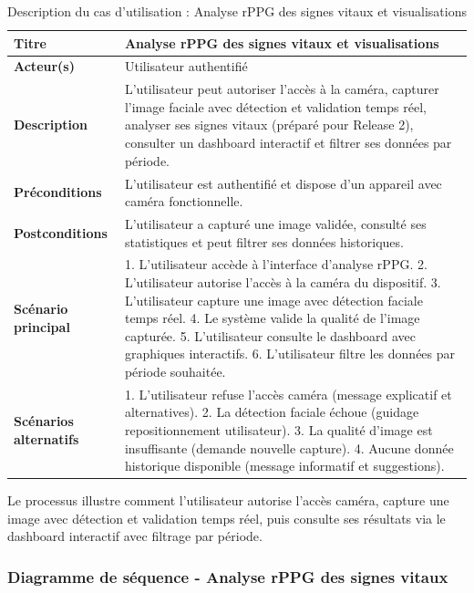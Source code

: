 \begin{table}[H]\centering
\small
\renewcommand{\arraystretch}{1.2}
\begin{tabularx}{\linewidth}{|p{3cm}|X|}
\hline
\textbf{Titre} & Analyse rPPG des signes vitaux et visualisations \\
\hline
\textbf{Acteur(s)} & Utilisateur authentifié \\
\hline
\textbf{Description} & L'utilisateur peut autoriser l'accès à la caméra, capturer l'image faciale avec détection et validation temps réel, analyser ses signes vitaux (préparé pour Release 2), consulter un dashboard interactif et filtrer ses données par période. \\
\hline
\textbf{Préconditions} & L'utilisateur est authentifié et dispose d'un appareil avec caméra fonctionnelle. \\
\hline
\textbf{Postconditions} & L'utilisateur a capturé une image validée, consulté ses statistiques et peut filtrer ses données historiques. \\
\hline
\textbf{Scénario principal} & 
1. L'utilisateur accède à l'interface d'analyse rPPG.
2. L'utilisateur autorise l'accès à la caméra du dispositif.
3. L'utilisateur capture une image avec détection faciale temps réel.
4. Le système valide la qualité de l'image capturée.
5. L'utilisateur consulte le dashboard avec graphiques interactifs.
6. L'utilisateur filtre les données par période souhaitée. \\
\hline
\textbf{Scénarios alternatifs} & 
1. L'utilisateur refuse l'accès caméra (message explicatif et alternatives).
2. La détection faciale échoue (guidage repositionnement utilisateur).
3. La qualité d'image est insuffisante (demande nouvelle capture).
4. Aucune donnée historique disponible (message informatif et suggestions). \\
\hline
\end{tabularx}
\caption{Description du cas d'utilisation : Analyse rPPG des signes vitaux et visualisations}
\end{table}

Le processus illustre comment l'utilisateur autorise l'accès caméra, capture une image avec détection et validation temps réel, puis consulte ses résultats via le dashboard interactif avec filtrage par période.

\subsubsection*{Diagramme de séquence - Analyse rPPG des signes vitaux}


